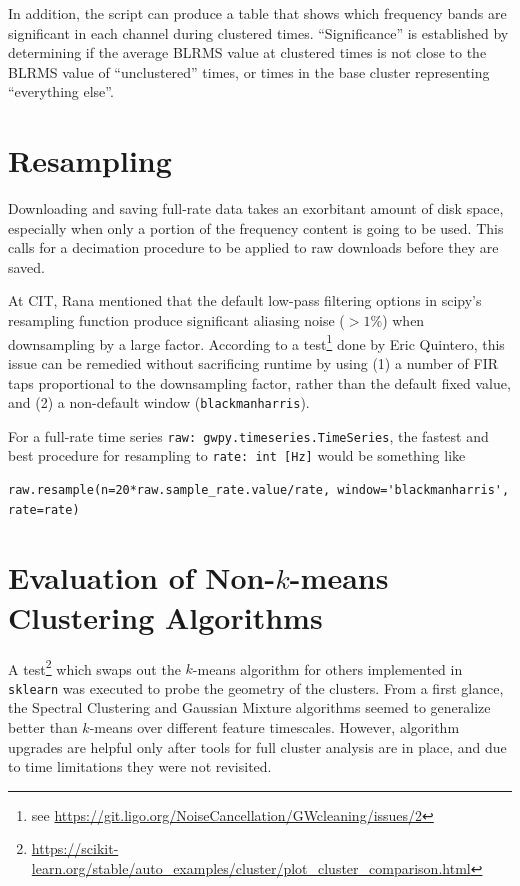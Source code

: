 \documentclass[colorlinks=true,pdfstartview=FitV,linkcolor=blue,
            citecolor=red,urlcolor=magenta]{ligodoc}
\begin{document}
In addition, the script can produce a table that shows which frequency bands are significant in each channel during clustered times.
``Significance'' is established by determining if the average BLRMS value at clustered times is not close to the BLRMS value of ``unclustered'' times, or times in the base cluster representing ``everything else''.


\appendix
\appendixpage
\section{Resampling}
Downloading and saving full-rate data takes an exorbitant amount of disk space, especially when only a portion of the frequency content is going to be used.
This calls for a decimation procedure to be applied to raw downloads before they are saved.

At CIT, Rana mentioned that the default low-pass filtering options in scipy's resampling function produce significant aliasing noise ($>1$\%) when downsampling by a large factor.
According to a test\footnote{see \url{https://git.ligo.org/NoiseCancellation/GWcleaning/issues/2}} done by Eric Quintero, this issue can be remedied without sacrificing runtime by using (1) a number of FIR taps proportional to the downsampling factor, rather than the default fixed value, and (2) a non-default window (\texttt{blackmanharris}).


For a full-rate time series \texttt{raw: gwpy.timeseries.TimeSeries}, the fastest and best procedure for resampling to \texttt{rate: int [Hz]} would be something like
\begin{verbatim}
raw.resample(n=20*raw.sample_rate.value/rate, window='blackmanharris', rate=rate)
\end{verbatim}

\section{Evaluation of Non-$k$-means Clustering Algorithms}\label{app:algo}
A test\footnote{\url{https://scikit-learn.org/stable/auto_examples/cluster/plot_cluster_comparison.html}} which swaps out the $k$-means algorithm for others implemented in \texttt{sklearn} was executed to probe the geometry of the clusters.
From a first glance, the Spectral Clustering and Gaussian Mixture algorithms seemed to generalize better than $k$-means over different feature timescales.
However, algorithm upgrades are helpful only after tools for full cluster analysis are in place, and due to time limitations they were not revisited.


\end{document}
